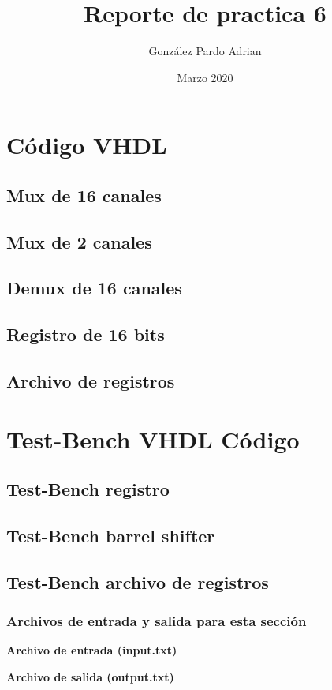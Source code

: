 \documentclass[8pt,executivepaper]{article}
\author{González Pardo Adrian}
\date{Marzo 2020}
\title{Reporte de practica 6}
\begin{document}
\maketitle
\section{Código VHDL}
\subsection{Mux de 16 canales}

\subsection{Mux de 2 canales}

\subsection{Demux de 16 canales}

\subsection{Registro de 16 bits}

\subsection{Archivo de registros}

\section{Test-Bench VHDL Código}
\subsection{Test-Bench registro}

\subsection{Test-Bench barrel shifter}

\subsection{Test-Bench archivo de registros}

\subsubsection{Archivos de entrada y salida para esta sección}
\textbf{Archivo de entrada (input.txt)}

\clearpage
\textbf{Archivo de salida (output.txt)}

\end{document}

